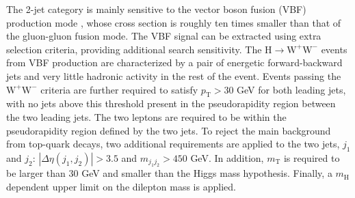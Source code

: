 \documentclass{PoS}
\newcommand{\Hi}{\ensuremath{\mathrm{H}}}
\newcommand{\W}{\ensuremath{\mathrm{W}}}
\newcommand{\WW}{\ensuremath{\W^+\W^-}}
\newcommand{\mHi}{\ensuremath{m_{\mathrm{H}}}}
\newcommand{\pt}{\ensuremath{p_\mathrm{T}}}
\newcommand{\hww}{\Hi\to\WW}
\begin{document}
The 2-jet category is mainly sensitive to the vector boson fusion
(VBF) production mode \cite{Ciccolini:2007jr}, whose cross section is
roughly ten times smaller than that of the gluon-gluon fusion mode.
The VBF signal can be extracted using extra selection criteria,
providing additional search sensitivity.  The $\hww$ events from VBF
production are characterized by a pair of energetic forward-backward
jets and very little hadronic activity in the rest of the event.
Events passing the $\WW$ criteria are further required to satisfy
$\pt>30$ GeV for both leading jets, with no jets above this threshold
present in the pseudorapidity region between the two leading jets. The
two leptons are required to be within the pseudorapidity region
defined by the two jets.  To reject the main background from top-quark
decays, two additional requirements are applied to the two jets, $j_1$
and $j_2$: $|\Delta\eta (j_1,j_2)| > 3.5$ and $m_{j_1j_2}
>450$ GeV. In addition, $m_\mathrm{T}$ is required to be larger than
30 GeV and smaller than the Higgs mass hypothesis. Finally, a
$\mHi$ dependent upper limit on the dilepton mass is applied.
\end{document}
